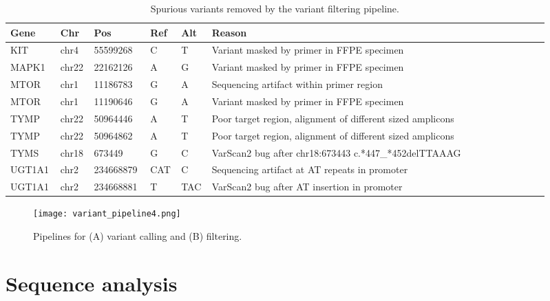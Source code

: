 \newpage
\begin{longtable}{p{0.08\linewidth}p{0.05\linewidth}p{0.1\linewidth}p{0.04\linewidth}p{0.04\linewidth}p{0.6\linewidth}}
    \caption{Spurious variants removed by the variant filtering pipeline.}
    \label{tbl:spurious_calls}
        \\
        \hline
        Gene & Chr & Pos & Ref & Alt & Reason
				\\
				\hline
				KIT & chr4 & 55599268 & C & T & Variant masked by primer in FFPE specimen
				\\
        MAPK1 & chr22 & 22162126 & A & G & Variant masked by primer in FFPE specimen
        \\
        MTOR & chr1 & 11186783 & G & A & Sequencing artifact within primer region
        \\
        MTOR & chr1 & 11190646 & G & A & Variant masked by primer in FFPE specimen
        \\
        TYMP & chr22 & 50964446 & A & T & Poor target region, alignment of different sized amplicons
        \\
        TYMP & chr22 & 50964862 & A & T & Poor target region, alignment of different sized amplicons
        \\
        TYMS & chr18 & 673449 & G & C & VarScan2 bug after chr18:673443 c.*447\_*452delTTAAAG
        \\
        UGT1A1 & chr2 & 234668879 & CAT & C & Sequencing artifact at AT repeats in promoter
        \\
        UGT1A1 & chr2 & 234668881 & T & TAC & VarScan2 bug after AT insertion in promoter
        \\
				\hline
\end{longtable}


\begin{figure}[H]
\centering
	\texttt{[image: variant\_pipeline4.png]}
	\caption{Pipelines for (A) variant calling and (B) filtering.}
	\label{fig:variant_pipeline}
\end{figure}

\newpage
\section{Sequence analysis}
\label{sec:Sequenceanalysis}

